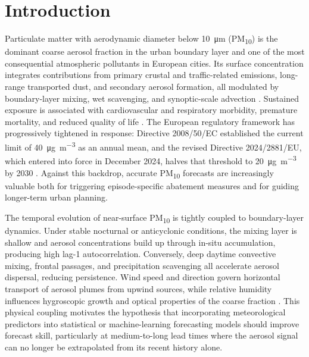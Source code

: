 \documentclass[12pt,a4paper]{article}
\newcommand{\PMten}{PM\textsubscript{10}}
\begin{document}
\newpage

\section{Introduction}
\label{sec:intro}

Particulate matter with aerodynamic diameter below 10~\si{\micro\metre}
(\PMten{}) is the dominant coarse aerosol fraction in the urban boundary layer
and one of the most consequential atmospheric pollutants in European cities.
Its surface concentration integrates contributions from primary crustal and
traffic-related emissions, long-range transported dust, and secondary aerosol
formation, all modulated by boundary-layer mixing, wet scavenging, and
synoptic-scale advection \citep{Seinfeld2006, Kumar2016}.  Sustained exposure
is associated with cardiovascular and respiratory morbidity, premature
mortality, and reduced quality of life \citep{WHO2021, EEA2023}.  The European
regulatory framework has progressively tightened in response: Directive
2008/50/EC established the current limit of
40~\si{\micro\gram\per\cubic\metre} as an annual mean, and the revised
Directive 2024/2881/EU, which entered into force in December 2024, halves that
threshold to 20~\si{\micro\gram\per\cubic\metre} by 2030 \citep{EU2024_2881}.
Against this backdrop, accurate \PMten{} forecasts are increasingly valuable
both for triggering episode-specific abatement measures and for guiding
longer-term urban planning.

The temporal evolution of near-surface \PMten{} is tightly coupled to
boundary-layer dynamics.  Under stable nocturnal or anticyclonic conditions,
the mixing layer is shallow and aerosol concentrations build up through
in-situ accumulation, producing high lag-1 autocorrelation.  Conversely,
deep daytime convective mixing, frontal passages, and precipitation scavenging
all accelerate aerosol dispersal, reducing persistence.  Wind speed and
direction govern horizontal transport of aerosol plumes from upwind sources,
while relative humidity influences hygroscopic growth and optical properties
of the coarse fraction \citep{Seinfeld2006, Kumar2016}.  This physical coupling
motivates the hypothesis that incorporating meteorological predictors into
statistical or machine-learning forecasting models should improve forecast
skill, particularly at medium-to-long lead times where the aerosol signal can
no longer be extrapolated from its recent history alone.
\end{document}
